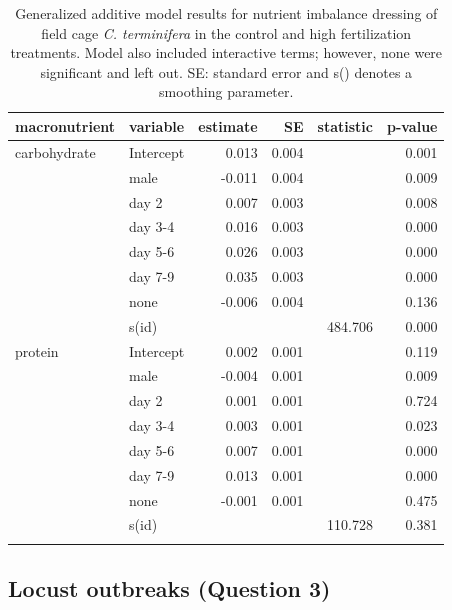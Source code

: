 \documentclass[
]{article}
\begin{document}
\begin{longtable}{llrrrr}

\toprule
macronutrient & variable & estimate & SE & statistic & p-value \\ 
\midrule\addlinespace[2.5pt]
carbohydrate & Intercept & 0.013 & 0.004 &  & 0.001 \\ 
 & male & -0.011 & 0.004 &  & 0.009 \\ 
 & day 2 & 0.007 & 0.003 &  & 0.008 \\ 
 & day 3-4 & 0.016 & 0.003 &  & 0.000 \\ 
 & day 5-6 & 0.026 & 0.003 &  & 0.000 \\ 
 & day 7-9 & 0.035 & 0.003 &  & 0.000 \\ 
 & none & -0.006 & 0.004 &  & 0.136 \\ 
 & s(id) &  &  & 484.706 & 0.000 \\ 
protein & Intercept & 0.002 & 0.001 &  & 0.119 \\ 
 & male & -0.004 & 0.001 &  & 0.009 \\ 
 & day 2 & 0.001 & 0.001 &  & 0.724 \\ 
 & day 3-4 & 0.003 & 0.001 &  & 0.023 \\ 
 & day 5-6 & 0.007 & 0.001 &  & 0.000 \\ 
 & day 7-9 & 0.013 & 0.001 &  & 0.000 \\ 
 & none & -0.001 & 0.001 &  & 0.475 \\ 
 & s(id) &  &  & 110.728 & 0.381 \\ 
\bottomrule

\caption{\label{tbl-field-cage-rebalancing}Generalized additive model
results for nutrient imbalance dressing of field cage \emph{C.
terminifera} in the control and high fertilization treatments. Model
also included interactive terms; however, none were significant and left
out. SE: standard error and s() denotes a smoothing parameter.}

\tabularnewline

\end{longtable}

\endgroup

\subsection{Locust outbreaks (Question
3)}\label{locust-outbreaks-question-3}
\end{document}
